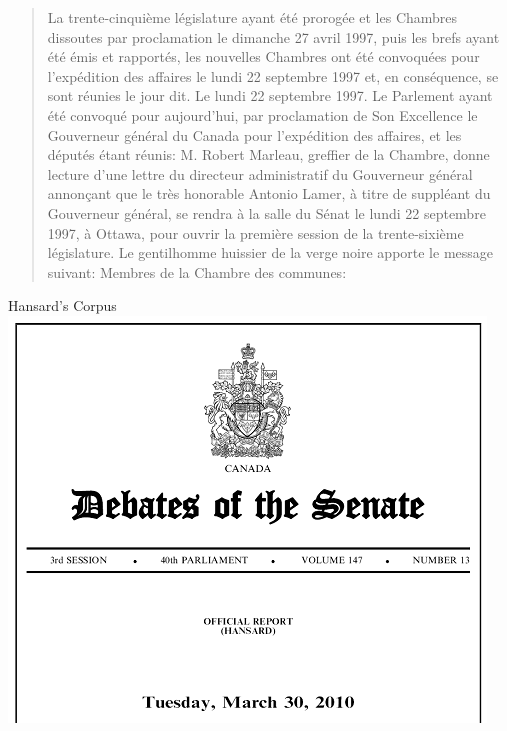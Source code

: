 \documentclass{beamer}
\begin{document}
\begin{frame}
  \begin{small}
  \begin{quote}
    La trente-cinquième législature ayant été prorogée et les Chambres dissoutes par proclamation le dimanche 27 avril 1997, puis les brefs ayant été émis et rapportés, les nouvelles Chambres ont été convoquées pour l'expédition des affaires le lundi 22 septembre 1997 et, en conséquence, se sont réunies le jour dit.  
Le lundi 22 septembre 1997.  
Le Parlement ayant été convoqué pour aujourd'hui, par proclamation de Son Excellence le Gouverneur général du Canada pour l'expédition des affaires, et les députés étant réunis: 
M. Robert Marleau, greffier de la Chambre, donne lecture d'une lettre du directeur administratif du Gouverneur général annonçant que le très honorable Antonio Lamer, à titre de suppléant du Gouverneur général, se rendra à la salle du Sénat le lundi 22 septembre 1997, à Ottawa, pour ouvrir la première session de la trente-sixième législature.  
Le gentilhomme huissier de la verge noire apporte le message suivant: 
Membres de la Chambre des communes: 

  \end{quote}
  \end{small}
\end{frame}

\begin{frame}{Hansard's Corpus}
  \includegraphics{hansards}
\end{frame}
\end{document}
